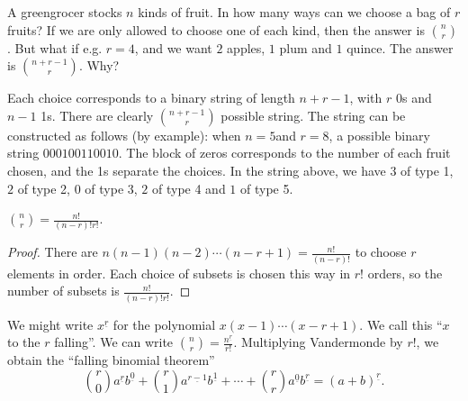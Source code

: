 \documentclass[a4paper]{article}
\begin{document}
  \begin{eg}
    A greengrocer stocks $n$ kinds of fruit. In how many ways can we choose a bag of $r$ fruits? If we are only allowed to choose one of each kind, then the answer is $\binom{n}{r}$. But what if e.g. $r = 4$, and we want $2$ apples, $1$ plum and $1$ quince. The answer is $\binom{n + r - 1}{r}$. Why?

    Each choice corresponds to a binary string of length $n + r - 1$, with $r$ 0s and $n - 1$ 1s. There are clearly $\binom{n + r - 1}{r}$ possible string. The string can be constructed as follows (by example): when $n = 5$and $r=8$, a possible binary string $000100110010$. The block of zeros corresponds to the number of each fruit chosen, and the 1s separate the choices. In the string above, we have $3$ of type 1, $2$ of type 2, $0$ of type 3, $2$ of type 4 and $1$ of type 5.
  \end{eg}

  \begin{prop}
    $\displaystyle\binom{n}{r} = \frac{n!}{(n - r)!r!}$.
  \end{prop}

  \begin{proof}
    There are $n(n - 1)(n - 2)\cdots (n - r + 1) = \frac{n!}{(n - r)!}$ to choose $r$ elements in order. Each choice of subsets is chosen this way in $r!$ orders, so the number of subsets is $\frac{n!}{(n - r)!r!}$.
  \end{proof}

  We might write $x^{\underline{r}}$ for the polynomial $x(x - 1)\cdots (x - r + 1)$. We call this ``$x$ to the $r$ falling''. We can write $\displaystyle \binom{n}{r} = \frac{n^{\underline{r}}}{r!}$. Multiplying Vandermonde by $r!$, we obtain the ``falling binomial theorem''
  \[
    \binom{r}{0}a^{\underline{r}}b^{\underline{0}} + \binom{r}{1}a^{\underline{r - 1}}b^{\underline{1}} + \cdots + \binom{r}{r}a^{\underline{0}}b^{\underline{r}} = (a + b)^{\underline{r}}.
  \]
\end{document}
